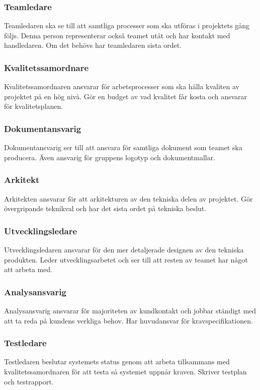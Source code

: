 \subsubsection*{Teamledare}
Teamledaren ska se till att samtliga processer som ska utföras i projektets gång följs. Denna person representerar också teamet utåt och har kontakt med handledaren. Om det behövs har teamledaren sista ordet.

\subsubsection*{Kvalitetssamordnare}
Kvalitetssamordnaren ansvarar för arbetsprocesser som ska hålla kvaliten av projektet på en hög nivå. Gör en budget av vad kvalitet får kosta och ansvarar för kvalitetsplanen.

\subsubsection*{Dokumentansvarig}
Dokumentansvarig ser till att ansvara för samtliga dokument som teamet ska producera. Även ansvarig för gruppens logotyp och dokumentmallar.

\subsubsection*{Arkitekt}
Arkitekten ansvarar för att arkitekturen av den tekniska delen av projektet. Gör övergripande teknikval och har det sista ordet på tekniska beslut.

\subsubsection*{Utvecklingsledare}
Utvecklingsledaren ansvarar för den mer detaljerade designen av den tekniska produkten. Leder utvecklingsarbetet och ser till att resten av teamet har något att arbeta med.

\subsubsection*{Analysansvarig}
Analysansvarig ansvarar för majoriteten av kundkontakt och jobbar ständigt med att ta reda på kundens verkliga behov. Har huvudansvar för kravspecifikationen.

\subsubsection*{Testledare}
Testledaren beslutar systemets status genom att arbeta tillsammans med kvalitetssamordnaren för att testa så systemet uppnår kraven. Skriver testplan och testrapport.

